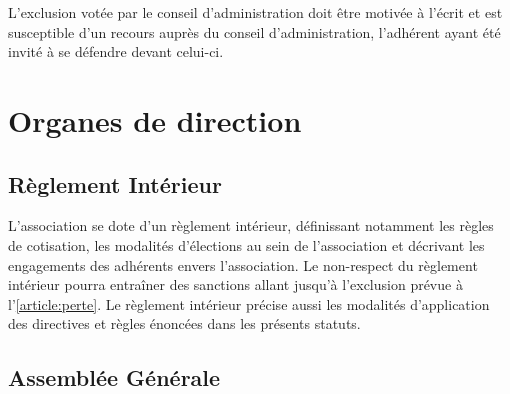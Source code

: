 \documentclass[12pt, a4paper]{article}
\begin{document}
L’exclusion votée par le conseil d’administration doit être motivée à l'écrit et est susceptible d’un recours auprès du conseil d’administration, l’adhérent ayant été invité à se défendre devant celui-ci.

\section{Organes de direction}

\subsection{Règlement Intérieur} \label{article:ri}

L’association se dote d’un règlement intérieur, définissant notamment les règles de cotisation, les modalités d’élections au sein de l’association et décrivant les engagements des adhérents envers l’association. Le non-respect du règlement intérieur pourra entraîner des sanctions allant jusqu’à l’exclusion prévue à l’\ref{article:perte}. Le règlement intérieur précise aussi les modalités d’application des directives et règles énoncées dans les présents statuts.

\subsection{Assemblée Générale} \label{article:ag}
\end{document}
